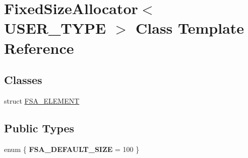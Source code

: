 \hypertarget{class_fixed_size_allocator}{}\section{Fixed\+Size\+Allocator$<$ U\+S\+E\+R\+\_\+\+T\+Y\+PE $>$ Class Template Reference}
\label{class_fixed_size_allocator}
\subsection*{Classes}
\begin{DoxyCompactItemize}
\item 
struct \hyperlink{struct_fixed_size_allocator_1_1_f_s_a___e_l_e_m_e_n_t}{F\+S\+A\+\_\+\+E\+L\+E\+M\+E\+NT}
\end{DoxyCompactItemize}
\subsection*{Public Types}
\begin{DoxyCompactItemize}
\item 
\mbox{\label{class_fixed_size_allocator_ac1babd155fdc91afbf6f482b72159bed}} 
enum \{ {\bfseries F\+S\+A\+\_\+\+D\+E\+F\+A\+U\+L\+T\+\_\+\+S\+I\+ZE} = 100
 \}
\end{DoxyCompactItemize}
